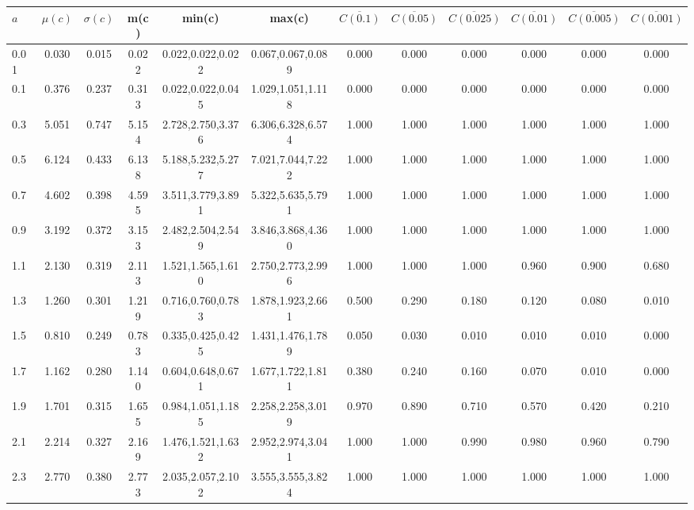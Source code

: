 \begin{table*}[h!]
\begin{center}
\begin{tabular}{| l | c | c | c | c | c | c | c | c | c | c | c |}\hline
$a$ & $\mu(c)$ & $\sigma(c)$ & m(c) & min(c) & max(c) & $\overline{C(0.1)}$ & $\overline{C(0.05)}$ & $\overline{C(0.025)}$ & $\overline{C(0.01)}$ & $\overline{C(0.005)}$ & $\overline{C(0.001)}$ \\\hline
0.01 & 0.030 & 0.015 & 0.022 & 0.022,0.022,0.022 & 0.067,0.067,0.089  & 0.000  & 0.000  & 0.000  & 0.000  & 0.000  & 0.000 \\\hline
0.1 & 0.376 & 0.237 & 0.313 & 0.022,0.022,0.045 & 1.029,1.051,1.118  & 0.000  & 0.000  & 0.000  & 0.000  & 0.000  & 0.000 \\\hline
0.3 & 5.051 & 0.747 & 5.154 & 2.728,2.750,3.376 & 6.306,6.328,6.574  & 1.000  & 1.000  & 1.000  & 1.000  & 1.000  & 1.000 \\\hline
0.5 & 6.124 & 0.433 & 6.138 & 5.188,5.232,5.277 & 7.021,7.044,7.222  & 1.000  & 1.000  & 1.000  & 1.000  & 1.000  & 1.000 \\\hline
0.7 & 4.602 & 0.398 & 4.595 & 3.511,3.779,3.891 & 5.322,5.635,5.791  & 1.000  & 1.000  & 1.000  & 1.000  & 1.000  & 1.000 \\\hline
0.9 & 3.192 & 0.372 & 3.153 & 2.482,2.504,2.549 & 3.846,3.868,4.360  & 1.000  & 1.000  & 1.000  & 1.000  & 1.000  & 1.000 \\\hline
1.1 & 2.130 & 0.319 & 2.113 & 1.521,1.565,1.610 & 2.750,2.773,2.996  & 1.000  & 1.000  & 1.000  & 0.960  & 0.900  & 0.680 \\\hline
1.3 & 1.260 & 0.301 & 1.219 & 0.716,0.760,0.783 & 1.878,1.923,2.661  & 0.500  & 0.290  & 0.180  & 0.120  & 0.080  & 0.010 \\\hline
1.5 & 0.810 & 0.249 & 0.783 & 0.335,0.425,0.425 & 1.431,1.476,1.789  & 0.050  & 0.030  & 0.010  & 0.010  & 0.010  & 0.000 \\\hline
1.7 & 1.162 & 0.280 & 1.140 & 0.604,0.648,0.671 & 1.677,1.722,1.811  & 0.380  & 0.240  & 0.160  & 0.070  & 0.010  & 0.000 \\\hline
1.9 & 1.701 & 0.315 & 1.655 & 0.984,1.051,1.185 & 2.258,2.258,3.019  & 0.970  & 0.890  & 0.710  & 0.570  & 0.420  & 0.210 \\\hline
2.1 & 2.214 & 0.327 & 2.169 & 1.476,1.521,1.632 & 2.952,2.974,3.041  & 1.000  & 1.000  & 0.990  & 0.980  & 0.960  & 0.790 \\\hline
2.3 & 2.770 & 0.380 & 2.773 & 2.035,2.057,2.102 & 3.555,3.555,3.824  & 1.000  & 1.000  & 1.000  & 1.000  & 1.000  & 1.000 \\\hline

\end{tabular}
\end{center}
\end{table*}
